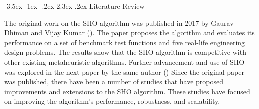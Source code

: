 \documentclass[12pt]{article}
\makeatletter
\renewcommand\section{\@startsection {section}{1}{1em}%
                                   {-3.5ex \@plus -1ex \@minus -.2ex}%
                                   {2.3ex \@plus.2ex}%
                                   {\normalfont\fontsize{14}{16}\bfseries}}
\makeatother
\begin{document}



\section{Literature Review}

The original work on the SHO algorithm was published in 2017 by Gaurav Dhiman and Vijay Kumar (\cite{dhiman2017spotted}). The paper proposes the algorithm and evaluates its performance on a set of benchmark test functions and five real-life engineering design problems. The results show that the SHO algorithm is competitive with other existing metaheuristic algorithms. Further advancement and use of SHO was explored in the next paper by the same author (\cite{dhiman2017spotted,dhiman2018multi}) Since the original paper was published, there have been a number of studies that have proposed improvements and extensions to the SHO algorithm. These studies have focused on improving the algorithm's performance, robustness, and scalability.
\end{document}
